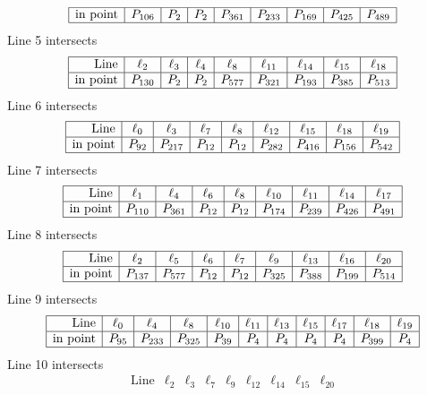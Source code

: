 \documentclass{article}
\begin{document}
{$$\begin{array}{|r*{8}{|c}|}
\hline
\mbox{in point}  & P_{106} & P_{2} & P_{2} & P_{361} & P_{233} & P_{169} & P_{425} & P_{489}\\
\hline
\end{array}
$$
Line 5 intersects 
$$
\begin{array}{|r*{8}{|c}|}
\hline
\mbox{Line}  & \ell_{2} & \ell_{3} & \ell_{4} & \ell_{8} & \ell_{11} & \ell_{14} & \ell_{15} & \ell_{18}\\
\hline
\mbox{in point}  & P_{130} & P_{2} & P_{2} & P_{577} & P_{321} & P_{193} & P_{385} & P_{513}\\
\hline
\end{array}
$$
Line 6 intersects 
$$
\begin{array}{|r*{8}{|c}|}
\hline
\mbox{Line}  & \ell_{0} & \ell_{3} & \ell_{7} & \ell_{8} & \ell_{12} & \ell_{15} & \ell_{18} & \ell_{19}\\
\hline
\mbox{in point}  & P_{92} & P_{217} & P_{12} & P_{12} & P_{282} & P_{416} & P_{156} & P_{542}\\
\hline
\end{array}
$$
Line 7 intersects 
$$
\begin{array}{|r*{8}{|c}|}
\hline
\mbox{Line}  & \ell_{1} & \ell_{4} & \ell_{6} & \ell_{8} & \ell_{10} & \ell_{11} & \ell_{14} & \ell_{17}\\
\hline
\mbox{in point}  & P_{110} & P_{361} & P_{12} & P_{12} & P_{174} & P_{239} & P_{426} & P_{491}\\
\hline
\end{array}
$$
Line 8 intersects 
$$
\begin{array}{|r*{8}{|c}|}
\hline
\mbox{Line}  & \ell_{2} & \ell_{5} & \ell_{6} & \ell_{7} & \ell_{9} & \ell_{13} & \ell_{16} & \ell_{20}\\
\hline
\mbox{in point}  & P_{137} & P_{577} & P_{12} & P_{12} & P_{325} & P_{388} & P_{199} & P_{514}\\
\hline
\end{array}
$$
Line 9 intersects 
$$
\begin{array}{|r*{10}{|c}|}
\hline
\mbox{Line}  & \ell_{0} & \ell_{4} & \ell_{8} & \ell_{10} & \ell_{11} & \ell_{13} & \ell_{15} & \ell_{17} & \ell_{18} & \ell_{19}\\
\hline
\mbox{in point}  & P_{95} & P_{233} & P_{325} & P_{39} & P_{4} & P_{4} & P_{4} & P_{4} & P_{399} & P_{4}\\
\hline
\end{array}
$$
Line 10 intersects 
$$
\begin{array}{|r*{8}{|c}|}
\hline
\mbox{Line}  & \ell_{2} & \ell_{3} & \ell_{7} & \ell_{9} & \ell_{12} & \ell_{14} & \ell_{15} & \ell_{20}\\

\end{array}$$}
\end{document}
